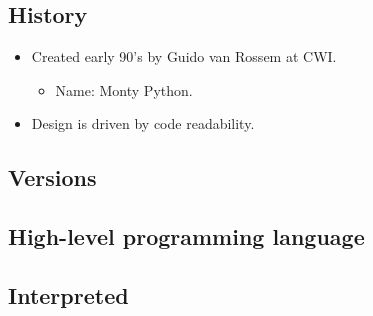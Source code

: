\documentclass[aspectratio=1610,slidestop]{beamer}
\begin{document}
\subsection{History}
\begin{pframe}
 \begin{itemize}
  \item Created early 90's by Guido van Rossem at CWI.
  \begin{itemize}
   \item Name: Monty Python.
  \end{itemize}
  \item Design is driven by code readability.
 \end{itemize}
\end{pframe}

\subsection{Versions}
\begin{pframe}
 \begin{center}
   
 \end{center}
\end{pframe}

\subsection{High-level programming language}
\begin{pframe}
 \begin{center}
   
 \end{center}
\end{pframe}

\subsection{Interpreted}
\begin{pframe}
 \begin{center}
   
 \end{center}
\end{pframe}
\end{document}
